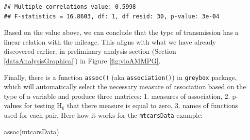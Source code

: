 \documentclass[
]{book}
\newenvironment{Shaded}{\begin{snugshade}}{\end{snugshade}}
\newcommand{\FunctionTok}[1]{\textcolor[rgb]{0.00,0.00,0.00}{#1}}
\newcommand{\NormalTok}[1]{#1}
\newcommand{\SpecialCharTok}[1]{\textcolor[rgb]{0.00,0.00,0.00}{#1}}
\theoremstyle{definition}
\theoremstyle{definition}
\theoremstyle{definition}
\theoremstyle{definition}
\theoremstyle{remark}
\begin{document}
\begin{Shaded}
\end{Shaded}

\begin{verbatim}
## Multiple correlations value: 0.5998
## F-statistics = 16.8603, df: 1, df resid: 30, p-value: 3e-04
\end{verbatim}

Based on the value above, we can conclude that the type of transmission has a linear relation with the mileage. This aligns with what we have already discovered earlier, in preliminary analysis section (Section \ref{dataAnalysisGraphical}) in Figure \ref{fig:vioAMMPG}.

Finally, there is a function \texttt{assoc()} (aka \texttt{association()}) in \texttt{greybox} package, which will automatically select the necessary measure of association based on the type of a variable and produce three matrices: 1. measures of association, 2. p-values for testing H\(_0\) that there measure is equal to zero, 3. names of functions used for each pair. Here how it works for the \texttt{mtcarsData} example:

\begin{Shaded}
\begin{Highlighting}[]
\FunctionTok{assoc}\NormalTok{(mtcarsData)}
\end{Highlighting}
\end{Shaded}
\end{document}
